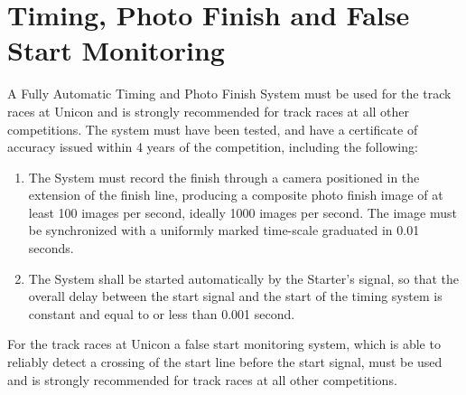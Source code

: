 \section{Timing, Photo Finish and False Start Monitoring}

A Fully Automatic Timing and Photo Finish System must be used for the track races at Unicon and is strongly recommended for track races at all other competitions.
The system must have been tested, and have a certificate of accuracy issued within 4 years of the competition, including the following:
\begin{enumerate}
\item The System must record the finish through a camera positioned in the extension of the finish line, producing a composite photo finish image of at least 100 images per second, ideally 1000 images per second. The image must be synchronized with a uniformly marked time-scale graduated in 0.01 seconds.
\item The System shall be started automatically by the Starter’s signal, so that the overall delay between the start signal and the start of the timing system is constant and equal to or less than 0.001 second.
\end{enumerate}

For the track races at Unicon a false start monitoring system, which is able to reliably detect a crossing of the start line before the start signal, must be used and is strongly recommended for track races at all other competitions.
